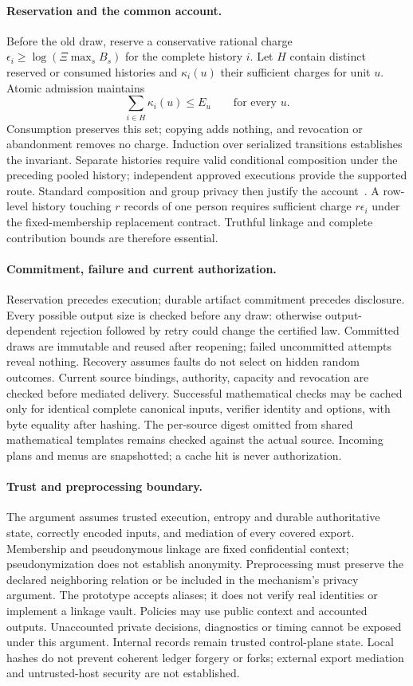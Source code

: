\paragraph{Reservation and the common account.}
\label{app:central-gate-proof}
Before the old draw, reserve a conservative rational charge
$\epsilon_i\ge\log(\Xi\max_s B_s)$ for the complete history $i$.
Let $H$ contain distinct reserved or consumed histories and
$\kappa_i(u)$ their sufficient charges for unit $u$. Atomic admission
maintains
\[
 \sum_{i\in H}\kappa_i(u)\le E_u\qquad\text{for every }u.
\]
Consumption preserves this set; copying adds nothing, and revocation or
abandonment removes no charge. Induction over serialized transitions
establishes the invariant. Separate histories require valid conditional
composition under the preceding pooled history; independent approved
executions provide the supported route. Standard composition and group
privacy then justify the account~\citep{dwork2014foundations}.
A row-level history touching $r$ records of one person requires sufficient
charge $r\epsilon_i$ under the fixed-membership replacement contract.
Truthful linkage and complete contribution bounds are therefore essential.

\paragraph{Commitment, failure and current authorization.}
Reservation precedes execution; durable artifact commitment precedes
disclosure. Every possible output size is checked before any draw:
otherwise output-dependent rejection followed by retry could change the
certified law. Committed draws are immutable and reused after reopening;
failed uncommitted attempts reveal nothing. Recovery assumes faults do not
select on hidden random outcomes. Current source bindings, authority,
capacity and revocation are checked before mediated delivery. Successful
mathematical checks may be cached only for identical complete canonical
inputs, verifier identity and options, with byte equality after hashing.
The per-source digest omitted from shared mathematical templates remains
checked against the actual source. Incoming plans and menus are snapshotted;
a cache hit is never authorization.

\paragraph{Trust and preprocessing boundary.}
\label{app:central-audit}
\label{app:stage-zero}
The argument assumes trusted execution, entropy and durable authoritative
state, correctly encoded inputs, and mediation of every covered export.
Membership and pseudonymous linkage are fixed confidential context;
pseudonymization does not establish anonymity. Preprocessing must preserve
the declared neighboring relation or be included in the mechanism's privacy
argument. The prototype accepts aliases; it does not verify real identities
or implement a linkage vault. Policies may use public context and accounted
outputs. Unaccounted private decisions, diagnostics or timing cannot be
exposed under this argument. Internal records remain trusted control-plane
state. Local hashes do not prevent coherent ledger forgery or forks;
external export mediation and untrusted-host security are not established.
